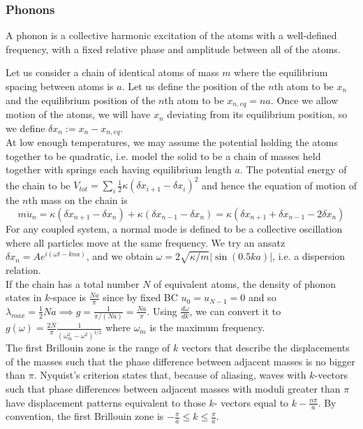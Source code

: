 \documentclass[a4paper]{article}
\begin{document}
\subsubsection*{Phonons}
\begin{defi}[Phonon]
A phonon is a collective harmonic excitation of the atoms with a well-defined frequency, with a fixed relative phase and amplitude between all of the atoms.
\end{defi}
\begin{Note}
Let us consider a chain of identical atoms of mass $m$ where the equilibrium spacing between atoms is $a$. Let us define the position of the $n$th atom to be $x_n$ and the equilibrium position of the $n$th atom to be $x_{n,eq}=na$. Once we allow motion of the atoms, we will have $x_n$ deviating from its equilibrium position, so we define $\delta x_n:=x_n-x_{n,eq}$.\\[5pt]
At low enough temperatures, we may assume the potential holding the atoms together to be quadratic, i.e. model the solid to be a chain of masses held together with springs each having equilibrium length $a$. The potential energy of the chain to be $V_{tot}=\sum_i\frac{1}{2}\kappa(\delta x_{i+1}-\delta x_i)^2$ and hence the equation of motion of the $n$th mass on the chain is 
$$m\ddot{u}_n=\kappa(\delta x_{n+1}-\delta x_n)+\kappa(\delta x_{n-1}-\delta x_n)=\kappa(\delta x_{n+1}+\delta x_{n-1}-2\delta x_n)$$
For any coupled system, a normal mode is defined to be a collective oscillation where all particles move at the same frequency. We try an ansatz $\delta x_n=Ae^{i(\omega t-kna)}$, and we obtain $\omega=2\sqrt{\kappa/m}|\sin(0.5ka)|$, i.e. a dispersion relation.\\[5pt]
If the chain has a total number $N$ of equivalent atoms, the density of phonon states in $k$-space is $\frac{Na}{\pi}$ since by fixed BC $u_0=u_{N-1}=0$ and so $\lambda_{max}=\frac{1}{2}Na\implies g=\frac{1}{\pi/(Na)}=\frac{Na}{\pi}$. Using $\frac{d\omega}{dk}$, we can convert it to $g(\omega)=\frac{2N}{\pi}\frac{1}{(\omega_m^2-\omega^2)^{1/2}}$ where $\omega_m$ is the maximum frequency.\\[5pt]
The first Brillouin zone is the range of $k$ vectors that describe the displacements of the masses such that the phase difference between adjacent masses is no bigger than $\pi$. Nyquist's criterion states that, because of aliasing, waves with $k$-vectors such that phase differences between adjacent masses with moduli greater than $\pi$ have displacement patterns equivalent to those $k$- vectors equal to $k-\frac{n\pi}{a}$. By convention, the first Brillouin zone is $-\frac{\pi}{a}\leq k\leq\frac{\pi}{a}$.
\end{Note}
\end{document}
